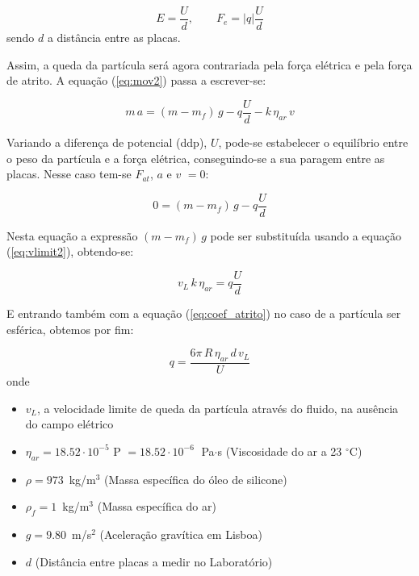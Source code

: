 \documentclass[a4paper,twoside,12pt]{article}      %
\begin{document}
\begin{equation*}
	E = \frac{U}{d}, \qquad  F_e = |q| \frac{U}{d}
\end{equation*}
sendo $d$ a distância entre as placas. 


Assim, a queda da partícula será agora contrariada pela força elétrica e pela força de atrito.
A equação (\ref{eq:mov2}) passa a escrever-se:

\begin{equation}
	\label{eq:mov3}
	m\,a = (m - m_f)\,g  - q \frac{U}{d} - k  \, \eta_{ar} \, v
\end{equation}

Variando a diferença de potencial (ddp), $U$, pode-se estabelecer o equilíbrio entre o peso da partícula e a força elétrica, conseguindo-se a sua paragem entre as placas. Nesse caso tem-se $F_{at}$, $a$ e  $v$  $=0$:

\begin{equation}
	\label{eq:equil}
	0 = (m - m_f)\,g  - q \frac{U}{d} 
\end{equation}

Nesta equação a expressão $(m - m_f)\,g$ pode ser substituída usando a equação (\ref{eq:vlimit2}), obtendo-se:

\begin{equation*}
	v_L\, k\, \eta_{ar} = q \frac{U}{d}
\end{equation*}

E entrando também com a equação (\ref{eq:coef_atrito}) no caso de a partícula ser esférica, obtemos por fim:

\begin{equation}
	\label{eq:carga}
	q = \frac{6 \pi \, R \, \eta_{ar} \, d\, v_L}{U}  
\end{equation}
onde

\begin{itemize}
\item $v_L$, a velocidade limite de queda da partícula através do fluido, na ausência do campo elétrico
\item $\eta_{ar} = 18.52 \cdot 10^{-5}$ P $=  18.52 \cdot 10^{-6} \;$ Pa$\cdot$s (Viscosidade do ar a 23 $^{\circ}$C)
\item $\rho = 973 \,$ kg/m$^{3}$ (Massa específica do óleo de silicone)
\item $\rho_f = 1 \,$ kg/m$^{3}$ (Massa específica do ar)
\item $g=9.80\,$ m/s$^{2}$ (Aceleração gravítica em Lisboa)
\item $d$ (Distância entre placas a medir no Laboratório)
\end{itemize}
\end{document}
